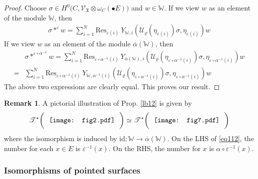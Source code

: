 \documentclass[11pt,b5paper,notitlepage]{article}
\theoremstyle{definition}
\newtheorem{rem}[df]{Remark}
\theoremstyle{plain}
\newcommand{\ovl}{\overline}
\newcommand{\Res}{\mathrm{Res}}
\newcommand{\SV}{\mathscr{V}}
\newcommand{\blt}{\bullet}
\newcommand{\Wbb}{\mathbb W}
\newcommand{\<}{\left\langle}
\renewcommand{\>}{\right\rangle}
\newcommand{\MU}{\mathcal{U}}
\newcommand{\fx}{\mathfrak{X}}
\newcommand{\ST}{\mathscr{T}}
\newcommand{\id}{\mathrm{id}}
\newcommand{\eps}{\varepsilon}
\numberwithin{equation}{section}
\begin{document}
	\begin{proof}
		Choose $\sigma\in H^0\big(C,\SV_\fx\otimes \omega_C(\blt E)\big)$ and $w\in \Wbb$. If we view $w$ as an element of the module $\Wbb$, then 
		\begin{gather*}
			\sigma*^\eps w=\sum_{i=1}^N\Res_{\eps(i)}~Y_{\Wbb,i}(\MU_\varrho(\eta_{\eps(i)})\sigma,\eta_{\eps(i)})w
		\end{gather*}
		If we view $w$ as an element of the module $\ovl{\alpha}(\Wbb)$, then
		\begin{align*}
&\sigma*^{\eps\circ \alpha^{-1}} w=\sum_{i=1}^N\Res_{\eps\circ\alpha^{-1}(i)}~Y_{\ovl\alpha(\Wbb),i}(\MU_\varrho(\eta_{\eps\circ\alpha^{-1}(i)})\sigma,\eta_{\eps\circ\alpha^{-1}(i)})w\\
=&\sum_{i=1}^N\Res_{{\eps\circ\alpha^{-1}(i)}}~Y_{\Wbb,\alpha^{-1}(i)}(\MU_\varrho(\eta_{\eps\circ\alpha^{-1}(i)})\sigma,\eta_{\eps\circ\alpha^{-1}(i)})w
		\end{align*}
The above two expressions are clearly equal. This proves our result.
	\end{proof}

\begin{rem}
A pictorial illustration of Prop. \ref{lb12} is given by
\begin{align}\label{eq112}
	\ST^*\bigg(~\vcenter{\hbox{{
		 \texttt{[image: fig2.pdf]}}}}~~\bigg)\simeq\ST^*\bigg(~\vcenter{\hbox{{
		 \texttt{[image: fig7.pdf]}}}}~~\bigg)
\end{align}
where the isomorphism is induced by $\id:\Wbb\rightarrow\ovl\alpha(\Wbb)$. On the LHS of \eqref{eq112}, the number for each $x\in E$ is $\eps^{-1}(x)$. On the RHS, the number for $x$ is $\alpha\circ\eps^{-1}(x)$.
\end{rem}










\subsubsection{Isomorphisms of pointed surfaces}
\end{document}

